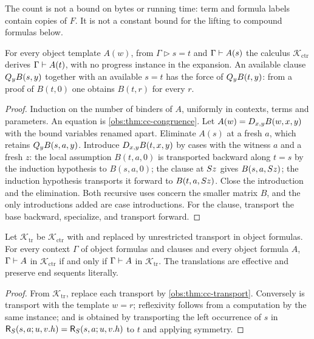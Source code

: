 The count is not a bound on bytes or running time: term and formula labels
contain copies of $F$. It is not a constant bound for the lifting to compound
formulas below.

\begin{theorem}
\label{obs:thm:cc-transport}
For every object template $A(w)$, from $\Gamma\mathrel{\triangleright}s=t$ and
$\Gamma\vdash A(s)$ the calculus $\mathcal{K}_{\mathrm{ctr}}$ derives
$\Gamma\vdash A(t)$, with no progress instance in the expansion. An available
clause $Q_{y}B(s,y)$ together with an available $s=t$ has the force of
$Q_{y}B(t,y)$: from a proof of $B(t,0)$ one obtains $B(t,r)$ for every $r$.
\end{theorem}

\begin{proof}
Induction on the number of binders of $A$, uniformly in contexts, terms and
parameters. An equation is \cref{obs:thm:cc-congruence}. Let
$A(w)=D_{x,y}B(w,x,y)$ with the bound variables renamed apart. Eliminate
$A(s)$ at a fresh $a$, which retains $Q_{y}B(s,a,y)$. Introduce
$D_{x,y}B(t,x,y)$ by cases with the witness $a$ and a fresh $z$: the local
assumption $B(t,a,0)$ is transported backward along $t=s$ by the induction
hypothesis to $B(s,a,0)$; the clause at $S z$ gives $B(s,a,S z)$; the
induction hypothesis transports it forward to $B(t,a,S z)$. Close the
introduction and the elimination. Both recursive uses concern the smaller
matrix $B$, and the only introductions added are case introductions. For the
clause, transport the base backward, specialize, and transport forward.
\end{proof}

\begin{corollary}
\label{obs:cor:cc-equiv}
Let $\mathcal{K}_{\mathrm{tr}}$ be $\mathcal{K}_{\mathrm{ctr}}$ with
 and  replaced by unrestricted transport in object
formulas. For every context $\Gamma$ of object formulas and clauses and every
object formula $A$, $\Gamma\vdash A$ in $\mathcal{K}_{\mathrm{ctr}}$ if and
only if $\Gamma\vdash A$ in $\mathcal{K}_{\mathrm{tr}}$. The translations are
effective and preserve end sequents literally.
\end{corollary}

\begin{proof}
From $\mathcal{K}_{\mathrm{tr}}$, replace each transport by
\cref{obs:thm:cc-transport}. Conversely  is transport with the
template $w=r$; reflexivity follows from a computation by the same instance;
and  is obtained by transporting the left occurrence of $s$ in
$\mathsf{R}_{S}(s,a;u,v.h)=\mathsf{R}_{S}(s,a;u,v.h)$ to $t$ and applying
symmetry.
\end{proof}

